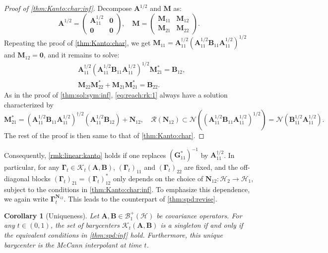 \documentclass[noinfoline]{imsart}\setcounter{tocdepth}{2}
\newcommand{\m}[1]{\mathbf{#1}} %
\renewcommand{\c}[1]{\mathcal{#1}} %
\theoremstyle{plain}
\newtheorem{corollary}[theorem]{Corollary}
\begin{document}
\begin{proof}[Proof of \cref{thm:Kanto:char:inf}]
Decompose $\m{A}^{1/2}$ and $\m{M}$ as:
\begin{equation*}
    \m{A}^{1/2} = \begin{pmatrix}
    \m{A}_{11}^{1/2} & \m{0} \\
    \m{0} & \m{0}
    \end{pmatrix}, \quad \m{M} = \begin{pmatrix}
    \m{M}_{11} & \m{M}_{12} \\
    \m{M}_{21} & \m{M}_{22}
    \end{pmatrix}.
\end{equation*}
Repeating the proof of \cref{thm:Kanto:char}, we get $\m{M}_{11} = \m{A}_{11}^{\dagger/2} (\m{A}_{11}^{1/2} \m{B}_{11} \m{A}_{11}^{1/2})^{1/2}$ and $\m{M}_{12} = \m{0}$, and it remains to solve:
\begin{align}
    &\m{A}_{11}^{\dagger/2} (\m{A}_{11}^{1/2} \m{B}_{11} \m{A}_{11}^{1/2})^{1/2} \m{M}_{21}^{*} = \m{B}_{12}, \label{eq:reach:rk:1:inf} \\
    &\m{M}_{22} \m{M}_{22}^{*} + \m{M}_{21} \m{M}_{21}^{*} = \m{B}_{22}. \label{eq:reach:rk:2:inf}
\end{align}
As in the proof of \cref{thm:sol:sym:inf},  \eqref{eq:reach:rk:1} always have a solution characterized by
\begin{equation*}
    \m{M}_{21}^{*} = (\m{A}_{11}^{1/2} \m{B}_{11} \m{A}_{11}^{1/2})^{\dagger/2} (\m{A}_{11}^{1/2} \m{B}_{12}) + \m{N}_{12}, \quad \c{R}(\m{N}_{12}) \subset \c{N}((\m{A}_{11}^{1/2} \m{B}_{11} \m{A}_{11}^{1/2})^{1/2}) = \c{N}(\m{B}_{11}^{1/2} \m{A}_{11}^{1/2}).
\end{equation*}
The rest of the proof is then same to that of \cref{thm:Kanto:char}.
\end{proof}


Consequently, \cref{rmk:linear:kanto} holds if one replaces $(\m{G}_{11}^{*})^{-1}$ by $\m{A}_{11}^{\dagger/2}$. In particular, for any $\m{\Gamma}_{t} \in \c{K}_{t}(\m{A}, \m{B})$, $(\m{\Gamma}_{t})_{11}$ and $(\m{\Gamma}_{t})_{22}$ are fixed, and the off-diagonal blocks $(\m{\Gamma}_{t})_{21} = (\m{\Gamma}_{t})_{12}^{*}$ only depends on the choice of $\m{N}_{12} : \c{H}_{2} \to \c{H}_{1}$, subject to the conditions in \cref{thm:Kanto:char:inf}. To emphasize this dependence, we again write $\m{\Gamma}_{t}^{\m{N}_{12}}$. This leads to the counterpart of \cref{thm:spd:revise}.

\begin{corollary}[Uniqueness]\label{thm:spd:revise:inf}
Let $\m{A}, \m{B} \in \c{B}_{1}^{+}(\c{H})$ be covariance operators. For any $t \in (0, 1)$, the set of barycenters $\c{K}_{t}(\m{A}, \m{B})$ is a singleton if and only if the equivalent conditions in \cref{thm:spd:inf} hold.
Furthermore, this unique barycenter is the McCann interpolant at time $t$.
\end{corollary}
\end{document}

